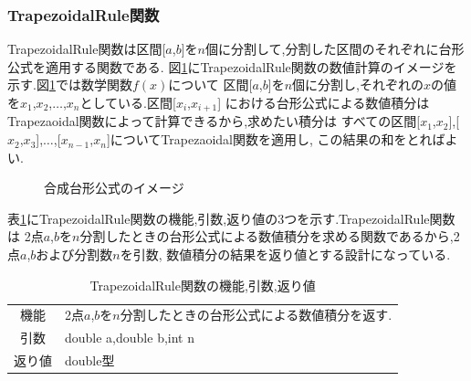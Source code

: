 \documentclass[dvipdfmx]{jarticle}
\begin{document}
    \subsubsection{TrapezoidalRule関数}
    TrapezoidalRule関数は区間[$a$,$b$]を$n$個に分割して,分割した区間のそれぞれに台形公式を適用する関数である.
    図\ref{gtrap}にTrapezoidalRule関数の数値計算のイメージを示す.図\ref{gtrap}では数学関数$f(x)$について
    区間[$a$,$b$]を$n$個に分割し,それぞれの$x$の値を$x_1$,$x_2$,$\dots$,$x_n$としている.区間[$x_i$,$x_{i+1}$]
    における台形公式による数値積分はTrapezaoidal関数によって計算できるから,求めたい積分は
    すべての区間[$x_1$,$x_2$],[$x_2$,$x_3$],$\dots$,[$x_{n-1}$,$x_n$]についてTrapezaoidal関数を適用し,
    この結果の和をとればよい.

    \begin{figure}[H]
      \centering
\caption{合成台形公式のイメージ} 
\label{gtrap}
\end{figure}

表\ref{TrapezoidalRuletable}にTrapezoidalRule関数の機能,引数,返り値の3つを示す.TrapezoidalRule関数は
2点$a$,$b$を$n$分割したときの台形公式による数値積分を求める関数であるから,2点$a$,$b$および分割数$n$を引数,
数値積分の結果を返り値とする設計になっている.

\begin{table}[H]
  \caption{TrapezoidalRule関数の機能,引数,返り値}
  \label{TrapezoidalRuletable}
  \begin{center}
      \begin{tabular}{c|l}\hline
    機能 & 2点$a$,$b$を$n$分割したときの台形公式による数値積分を返す.\\
    引数 & double a,double b,int n\\
    返り値 & double型 \\ \hline
      \end{tabular}
  \end{center}
  \end{table}
\end{document}
